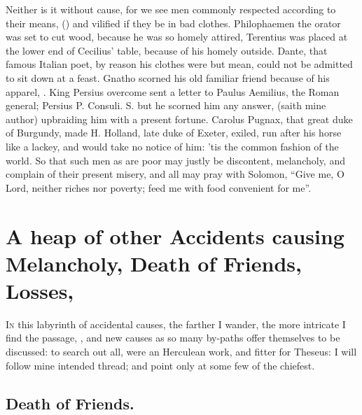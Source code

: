 Neither is it without cause, for we see men commonly respected according to
their means, () and vilified if they be in bad clothes.
Philophaemen the orator was set to cut wood, because he
was so homely attired, Terentius was placed at the lower
end of Cecilius' table, because of his homely outside.
Dante, that famous Italian poet, by reason his clothes
were but mean, could not be admitted to sit down at a feast. Gnatho scorned his
old familiar friend because of his apparel, . King Persius
overcome sent a letter to Paulus Aemilius, the Roman
general; Persius P. Consuli. S. but he scorned him any answer,  (saith mine author) upbraiding him with a present
fortune. Carolus Pugnax, that great duke of Burgundy, made
H. Holland, late duke of Exeter, exiled, run after his horse like a lackey, and
would take no notice of him: 'tis the common fashion of
the world. So that such men as are poor may justly be discontent, melancholy,
and complain of their present misery, and all may pray with
Solomon, \enquote{Give me, O Lord, neither riches nor poverty;
feed me with food convenient for me}.

\section[Accidents, Death of Friends, Losses]{A heap of other Accidents causing
Melancholy, Death of Friends, Losses,
\etc{}}\label{sec:accidents-death-of-friends}

\lettrine{I}{n} this labyrinth of accidental causes, the farther I wander, the
more intricate I find the passage, , and new causes as so
many by-paths offer themselves to be discussed: to search out all, were an
Herculean work, and fitter for Theseus: I will follow mine intended thread; and
point only at some few of the chiefest.

\subsection{Death of Friends.}

